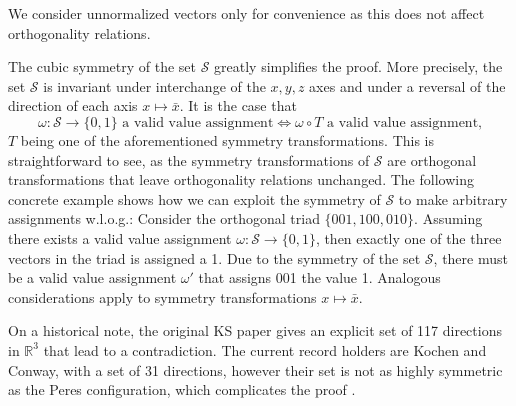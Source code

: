 We consider unnormalized vectors only for convenience as this does not affect orthogonality relations. 

The cubic symmetry of the set $\mathcal{S}$ greatly simplifies the proof. More precisely, the set $\mathcal{S}$ is invariant under interchange of the $x,y,z$ axes and under a reversal of the direction of each axis $x\mapsto\bar{x}$. It is the case that \begin{equation*}
\omega:\mathbb{\mathcal{S}\rightarrow}\{0,1\}\text{ a valid value assignment}\iff\omega\circ T\text{ a valid value assignment,}\end{equation*}
$T$ being one of the aforementioned symmetry transformations. This is straightforward to see, as the symmetry transformations of $\mathcal{S}$ are orthogonal transformations that leave orthogonality relations unchanged. The following concrete example shows how we can exploit the symmetry of $\mathcal{S}$ to make arbitrary assignments w.l.o.g.: Consider the orthogonal triad $\{001,100,010\}$. Assuming there exists a valid value assignment $\omega:\mathbb{\mathcal{S}\rightarrow}\{0,1\}$, then exactly one of the three vectors in the triad is assigned a 1. Due to the symmetry of the set $\mathcal{
S}$, there must be a valid value assignment $\omega'$ that assigns 001 the value 1. Analogous considerations apply to symmetry transformations $x\mapsto\bar{x}$. 

On a historical note, the original KS paper \cite{Kochen1968} gives an explicit set of 117 directions in $\mathbb{R}^{3}$ that lead to a contradiction. The current record holders are Kochen and Conway, with a set of 31 directions, however their set is not as highly symmetric as the Peres configuration, which complicates the proof \cite{Peres2002}.

